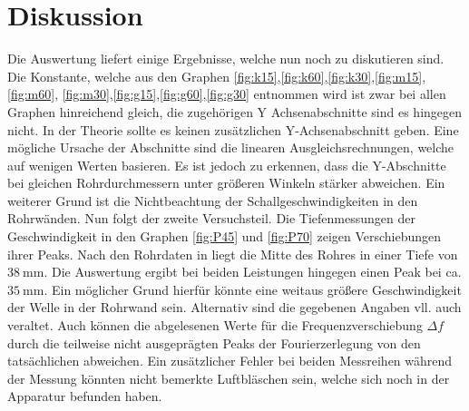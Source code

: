 
\section{Diskussion}
\label{sec:Diskussion}
Die Auswertung liefert einige Ergebnisse, welche nun noch zu diskutieren sind.
Die Konstante, welche aus den Graphen \ref{fig:k15},\ref{fig:k60},\ref{fig:k30},\ref{fig:m15},\ref{fig:m60},
\ref{fig:m30},\ref{fig:g15},\ref{fig:g60},\ref{fig:g30} entnommen wird ist zwar
bei allen Graphen hinreichend gleich, die zugehörigen Y Achsenabschnitte sind es
hingegen nicht. In der Theorie sollte es keinen zusätzlichen Y-Achsenabschnitt geben.
 Eine mögliche Ursache der Abschnitte sind die linearen Ausgleichsrechnungen,
welche auf wenigen Werten basieren. Es ist jedoch zu erkennen, dass die Y-Abschnitte
bei gleichen Rohrdurchmessern unter größeren Winkeln stärker abweichen. Ein weiterer
Grund ist die Nichtbeachtung der Schallgeschwindigkeiten in
den Rohrwänden. Nun folgt der zweite Versuchsteil. Die Tiefenmessungen der Geschwindigkeit in den Graphen \ref{fig:P45} und
\ref{fig:P70} zeigen Verschiebungen ihrer Peaks. Nach den Rohrdaten in \cite{US3}
 liegt die Mitte des Rohres in einer Tiefe von $\SI{38}{\milli\meter}$. Die Auswertung ergibt bei beiden
  Leistungen hingegen einen Peak bei ca. $\SI{35}{\milli\meter}$. Ein möglicher Grund
  hierfür könnte eine weitaus größere Geschwindigkeit der Welle in der Rohrwand sein.
  Alternativ sind die gegebenen Angaben vll. auch veraltet.
Auch können die abgelesenen Werte für die Frequenzverschiebung $\Delta f$ durch
die teilweise nicht ausgeprägten Peaks der Fourierzerlegung von den tatsächlichen abweichen.
Ein zusätzlicher Fehler bei beiden Messreihen während der Messung könnten nicht bemerkte Luftbläschen sein,
welche sich noch in der Apparatur befunden haben.





